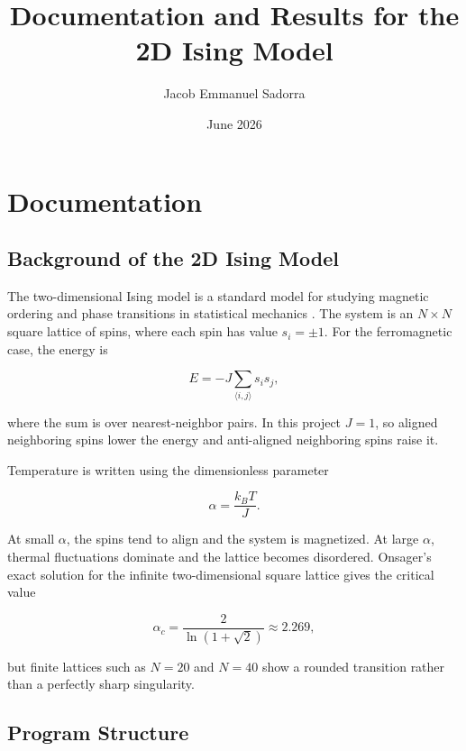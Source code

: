 \documentclass[11pt]{article}
\title{Documentation and Results for the 2D Ising Model}
\author{Jacob Emmanuel Sadorra}
\date{June 2026}
\let\oldsection\section
\renewcommand{\section}[1]{\Needspace{3\baselineskip}\oldsection{#1}}
\let\oldsubsection\subsection
\renewcommand{\subsection}[1]{\Needspace{2\baselineskip}\oldsubsection{#1}}
\begin{document}
\maketitle

\section{Documentation}

\subsection{Background of the 2D Ising Model}

The two-dimensional Ising model is a standard model for studying magnetic ordering and phase transitions in statistical mechanics \cite{chandler1987,pathria2011}. The system is an $N \times N$ square lattice of spins, where each spin has value $s_i=\pm 1$. For the ferromagnetic case, the energy is

\medskip

\begin{equation}
E=-J\sum_{\langle i,j\rangle}s_i s_j,
\end{equation}

\medskip
where the sum is over nearest-neighbor pairs. In this project $J=1$, so aligned neighboring spins lower the energy and anti-aligned neighboring spins raise it.

Temperature is written using the dimensionless parameter

\medskip

\begin{equation}
\alpha=\frac{k_B T}{J}.
\end{equation}

\medskip
At small $\alpha$, the spins tend to align and the system is magnetized. At large $\alpha$, thermal fluctuations dominate and the lattice becomes disordered. Onsager's exact solution for the infinite two-dimensional square lattice gives the critical value \cite{onsager1944}

\medskip

\begin{equation}
\alpha_c=\frac{2}{\ln(1+\sqrt{2})}\approx 2.269,
\end{equation}

\medskip
but finite lattices such as $N=20$ and $N=40$ show a rounded transition rather than a perfectly sharp singularity.

\subsection{Program Structure}
\end{document}
